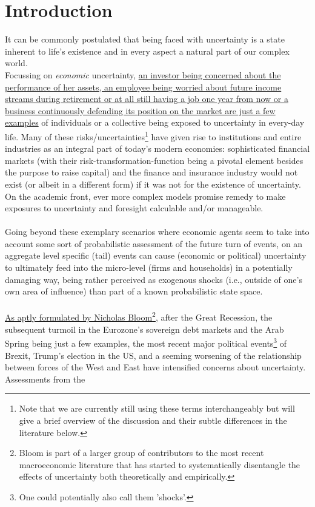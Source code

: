 \documentclass[a4paper,11pt,listof=nochaptergap,oneside,pointednumbers,bibtotoc,bigheadings,liststotoc]{scrbook}
\begin{document}
\chapter{Introduction}
It can be commonly postulated that being faced with uncertainty is a state inherent to life's existence and in every aspect a natural part of our complex world. \\
Focussing on \textit{economic} uncertainty, \href{http://citeseerx.ist.psu.edu/viewdoc/download?doi=10.1.1.334.4248&rep=rep1&type=pdf}{an investor being concerned about the performance of her assets, an employee being worried about future income streams during retirement or at all still having a job one year from now or a business continuously defending its position on the market are just a few examples} of individuals or a collective being exposed to uncertainty in every-day life. Many of these risks/uncertainties\footnote{Note that we are currently still using these terms interchangeably but will give a brief overview of the discussion and their subtle differences in the literature below.} have given rise to institutions and entire industries as an integral part of today's modern economies: sophisticated financial markets (with their risk-transformation-function being a pivotal element besides the purpose to raise capital) and the finance and insurance industry would not exist (or albeit in a different form) if it was not for the existence of uncertainty. On the academic front, ever more complex models promise remedy to make exposures to uncertainty and foresight calculable and/or manageable.\\
\\
Going beyond these exemplary scenarios where economic agents seem to take into account some sort of probabilistic assessment of the future turn of events, on an aggregate level specific (tail) events can cause (economic or political) uncertainty to ultimately feed into the micro-level (firms and households) in a potentially damaging way, being rather perceived as exogenous shocks (i.e., outside of one's own area of influence) than part of a known probabilistic state space.\\
\\
\href{https://site.stanford.edu/2018/session-6}{As aptly formulated by Nicholas Bloom}\footnote{Bloom is part of a larger group of contributors to the most recent macroeconomic literature that has started to systematically disentangle the effects of uncertainty both theoretically and empirically.}, after the Great Recession, the subsequent turmoil in the Eurozone's sovereign debt markets and the Arab Spring being just a few examples, the most recent major political events\footnote{One could potentially also call them 'shocks'.} of Brexit, Trump's election in the US,  and a seeming worsening of the relationship between forces of the West and East have intensified concerns about uncertainty. Assessments from the 
\end{document}
